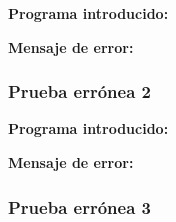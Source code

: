 \documentclass[11pt, , a4paper, titlepage]{article}
\newenvironment{changemargin}[2]{%
\begin{list}{}{%
\setlength{\topsep}{0pt}%
\setlength{\leftmargin}{#1}%
\setlength{\rightmargin}{#2}%
\setlength{\listparindent}{\parindent}%
\setlength{\itemindent}{\parindent}%
\setlength{\parsep}{\parskip}%
}%
\item[]}{\end{list}}
\begin{document}
\begin{changemargin}{+0.5cm}{+0cm}
    \vspace{1mm}

    \textbf{Programa introducido:}
    \begin{changemargin}{+0.5cm}{+0cm}
        
    \end{changemargin}

    \vspace{2mm}

    \textbf{Mensaje de error:}
    \vspace{1mm}
    \begin{changemargin}{+0.5cm}{+0cm}
    \end{changemargin}

\end{changemargin}

\subsubsection{Prueba errónea 2}

\begin{changemargin}{+0.5cm}{+0cm}
    \vspace{1mm}

    \textbf{Programa introducido:}
    \begin{changemargin}{+0.5cm}{+0cm}
        
    \end{changemargin}

    \vspace{2mm}

    \textbf{Mensaje de error:}
    \vspace{1mm}
    \begin{changemargin}{+0.5cm}{+0cm}
    \end{changemargin}

\end{changemargin}

\subsubsection{Prueba errónea 3}
\end{document}
